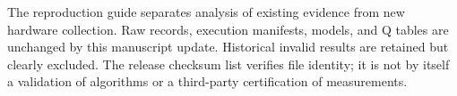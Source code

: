 \documentclass[journal]{IEEEtran}
\begin{document}
The reproduction guide separates analysis of existing evidence from new hardware collection. Raw records, execution manifests, models, and Q tables are unchanged by this manuscript update. Historical invalid results are retained but clearly excluded. The release checksum list verifies file identity; it is not by itself a validation of algorithms or a third-party certification of measurements.
\end{document}
